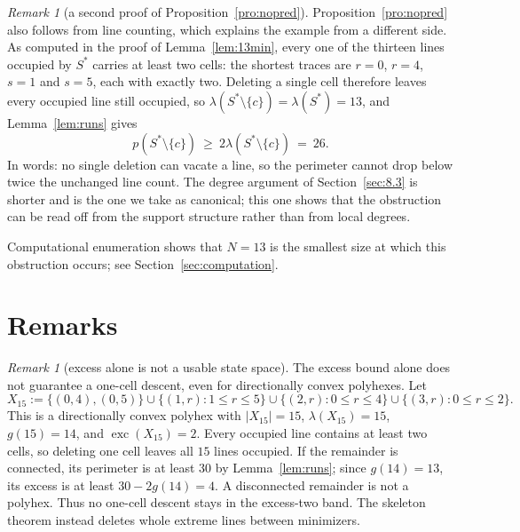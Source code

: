 \documentclass[11pt]{article}
\theoremstyle{plain}
\theoremstyle{definition}
\theoremstyle{remark}
\newtheorem{remark}[theorem]{Remark}
\newcommand{\sm}{\setminus}
\DeclareMathOperator{\exc}{exc}
\begin{document}
\begin{remark}[a second proof of Proposition~\ref{pro:nopred}]\label{rem:linecount}
Proposition~\ref{pro:nopred} also follows from line counting, which explains the example
from a different side. As computed in the proof of Lemma~\ref{lem:13min}, every one of the
thirteen lines occupied by \(S^{\ast}\) carries at least two cells: the shortest traces are
\(r=0\), \(r=4\), \(s=1\) and \(s=5\), each with exactly two. Deleting a single cell
therefore leaves every occupied line still occupied, so
\(\lambda(S^{\ast}\sm\{c\})=\lambda(S^{\ast})=13\), and Lemma~\ref{lem:runs} gives
\[
   p(S^{\ast}\sm\{c\})\ \ge\ 2\lambda(S^{\ast}\sm\{c\})\ =\ 26 .
\]
In words: no single deletion can vacate a line, so the perimeter cannot drop below twice
the unchanged line count. The degree argument of Section~\ref{sec:8.3} is shorter and is
the one we take as canonical; this one shows that the obstruction can be read off from the
support structure rather than from local degrees.
\end{remark}

Computational enumeration shows that \(N=13\) is the smallest size at which this
obstruction occurs; see Section~\ref{sec:computation}.



\section{Remarks}\label{sec:remarks}

\begin{remark}[excess alone is not a usable state space]\label{rem:x31}
The excess bound alone does not guarantee a one-cell descent, even for
directionally convex polyhexes. Let
\[
X_{15}:=\{(0,4),(0,5)\}\cup\{(1,r):1\le r\le5\}
\cup\{(2,r):0\le r\le4\}\cup\{(3,r):0\le r\le2\}.
\]
This is a directionally convex polyhex with \(|X_{15}|=15\),
\(\lambda(X_{15})=15\), \(g(15)=14\), and \(\exc(X_{15})=2\).
Every occupied line contains at least two cells, so deleting one cell
leaves all \(15\) lines occupied. If the remainder is connected, its
perimeter is at least \(30\) by Lemma~\ref{lem:runs}; since \(g(14)=13\),
its excess is at least \(30-2g(14)=4\). A disconnected remainder is
not a polyhex. Thus no one-cell descent stays in the excess-two band.
The skeleton theorem instead deletes whole extreme lines between minimizers.
\end{remark}
\end{document}
